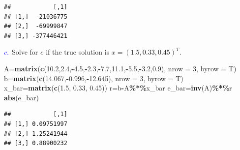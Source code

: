 \documentclass[
]{article}
\newenvironment{Shaded}{\begin{snugshade}}{\end{snugshade}}
\newcommand{\AttributeTok}[1]{\textcolor[rgb]{0.13,0.29,0.53}{#1}}
\newcommand{\DecValTok}[1]{\textcolor[rgb]{0.00,0.00,0.81}{#1}}
\newcommand{\FloatTok}[1]{\textcolor[rgb]{0.00,0.00,0.81}{#1}}
\newcommand{\FunctionTok}[1]{\textcolor[rgb]{0.13,0.29,0.53}{\textbf{#1}}}
\newcommand{\NormalTok}[1]{#1}
\newcommand{\OtherTok}[1]{\textcolor[rgb]{0.56,0.35,0.01}{#1}}
\newcommand{\SpecialCharTok}[1]{\textcolor[rgb]{0.81,0.36,0.00}{\textbf{#1}}}
\begin{document}
\begin{verbatim}
##            [,1]
## [1,]  -21036775
## [2,]  -69999847
## [3,] -377446421
\end{verbatim}

\(\textcolor{blue}{c.}\) Solve for \(e\) if the true solution is
\(x = (1.5, 0.33, 0.45)^{T}\).

\begin{Shaded}
\begin{Highlighting}[]
\NormalTok{A}\OtherTok{=}\FunctionTok{matrix}\NormalTok{(}\FunctionTok{c}\NormalTok{(}\FloatTok{10.2}\NormalTok{,}\FloatTok{2.4}\NormalTok{,}\SpecialCharTok{{-}}\FloatTok{4.5}\NormalTok{,}\SpecialCharTok{{-}}\FloatTok{2.3}\NormalTok{,}\SpecialCharTok{{-}}\FloatTok{7.7}\NormalTok{,}\FloatTok{11.1}\NormalTok{,}\SpecialCharTok{{-}}\FloatTok{5.5}\NormalTok{,}\SpecialCharTok{{-}}\FloatTok{3.2}\NormalTok{,}\FloatTok{0.9}\NormalTok{), }\AttributeTok{nrow =} \DecValTok{3}\NormalTok{, }\AttributeTok{byrow =}\NormalTok{ T)}
\NormalTok{b}\OtherTok{=}\FunctionTok{matrix}\NormalTok{(}\FunctionTok{c}\NormalTok{(}\FloatTok{14.067}\NormalTok{,}\SpecialCharTok{{-}}\FloatTok{0.996}\NormalTok{,}\SpecialCharTok{{-}}\FloatTok{12.645}\NormalTok{), }\AttributeTok{nrow =} \DecValTok{3}\NormalTok{, }\AttributeTok{byrow =}\NormalTok{ T)}
\NormalTok{x\_bar}\OtherTok{=}\FunctionTok{matrix}\NormalTok{(}\FunctionTok{c}\NormalTok{(}\FloatTok{1.5}\NormalTok{, }\FloatTok{0.33}\NormalTok{, }\FloatTok{0.45}\NormalTok{))}
\NormalTok{r}\OtherTok{=}\NormalTok{b}\SpecialCharTok{{-}}\NormalTok{A}\SpecialCharTok{\%*\%}\NormalTok{x\_bar}
\NormalTok{e\_bar}\OtherTok{=}\FunctionTok{inv}\NormalTok{(A)}\SpecialCharTok{\%*\%}\NormalTok{r}
\FunctionTok{abs}\NormalTok{(e\_bar)}
\end{Highlighting}
\end{Shaded}

\begin{verbatim}
##            [,1]
## [1,] 0.09751997
## [2,] 1.25241944
## [3,] 0.88900232
\end{verbatim}
\end{document}
